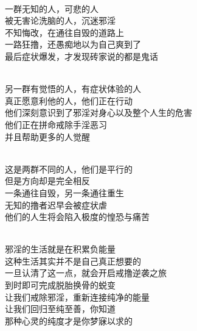 \begin{poem}[自毁与重生的平行世界]
    \begin{multicols}{2}
        \begin{center}~\\
            一群无知的人，可悲的人 \\ 被无害论洗脑的人，沉迷邪淫 \\ 不知悔改，在通往自毁的道路上 \\ 一路狂撸，还愚痴地以为自己爽到了 \\ 最后症状爆发，才发现砖家说的都是鬼话

            ~\\

            另一群有觉悟的人，有症状体验的人 \\ 真正愿意利他的人，他们正在行动 \\ 他们深刻意识到了邪淫对身心以及整个人生的危害 \\ 他们正在拼命戒除手淫恶习 \\ 并且帮助更多的人觉醒

            ~\\

            这是两群不同的人，他们是平行的 \\ 但是方向却是完全相反 \\ 一条通往自毁，另一条通往重生 \\ 无知的撸者迟早会被症状虐 \\ 他们的人生将会陷入极度的惶恐与痛苦

            ~\\

            邪淫的生活就是在积累负能量 \\ 这种生活其实并不是自己真正想要的 \\ 一旦认清了这一点，就会开启戒撸逆袭之旅 \\ 到时即可完成脱胎换骨的蜕变 \\ 让我们戒除邪淫，重新连接纯净的能量 \\ 让我们回归至纯至善，你知道 \\ 那种心灵的纯度才是你梦寐以求的
        \end{center}
    \end{multicols}
\end{poem}


